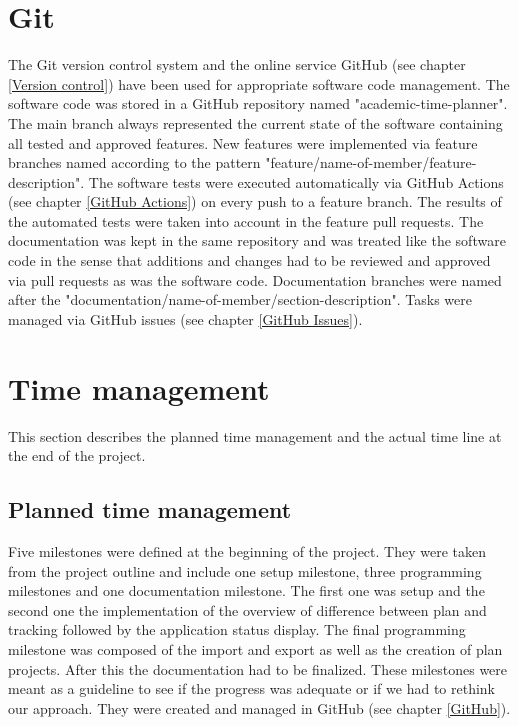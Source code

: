 \section{Git}
The Git version control system and the online service GitHub (see chapter \ref{Version control}) have been used for appropriate software code management. The software code was stored in a GitHub repository named "academic-time-planner". The main branch always represented the current state of the software containing all tested and approved features. New features were implemented via feature branches named according to the pattern "feature/name-of-member/feature-description". The software tests were executed automatically via GitHub Actions (see chapter \ref{GitHub Actions}) on every push to a feature branch. The results of the automated tests were taken into account in the feature pull requests. The documentation was kept in the same repository and was treated like the software code in the sense that additions and changes had to be reviewed and approved via pull requests as was the software code. Documentation branches were named after the "documentation/name-of-member/section-description". Tasks were managed via GitHub issues (see chapter \ref{GitHub Issues}).

\section{Time management} \label{Time management}
This section describes the planned time management and the actual time line at the end of the project.
\subsection{Planned time management}
Five milestones were defined at the beginning of the project. They were taken from the project outline and include one setup milestone, three programming milestones and one documentation milestone. The first one was setup and the second one the implementation of the overview of difference between plan and tracking followed by the application status display. The final programming milestone was composed of the import and export as well as the creation of plan projects. After this the documentation had to be finalized. These milestones were meant as a guideline to see if the progress was adequate or if we had to rethink our approach. They were created and managed in GitHub (see chapter \ref{GitHub}). 
